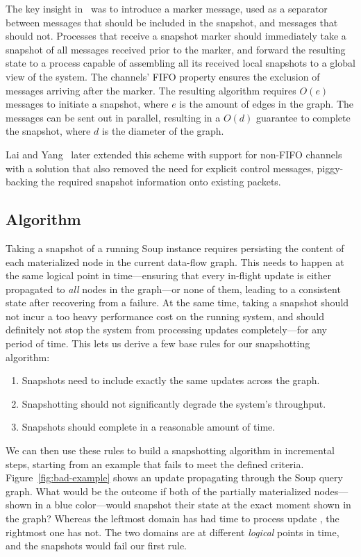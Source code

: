 The key insight in~\cite{chandy-lamport} was to introduce a marker message, used
as a separator between messages that should be included in the snapshot, and
messages that should not. Processes that receive a snapshot marker should
immediately take a snapshot of all messages received prior to the marker, and
forward the resulting state to a process capable of assembling all its received
local snapshots to a global view of the system. The channels' FIFO property
ensures the exclusion of messages arriving after the marker. The resulting
algorithm requires $ O(e) $ messages to initiate a snapshot, where $ e $
is the amount of edges in the graph. The messages can be sent out in parallel,
resulting in a $ O(d) $ guarantee to complete the snapshot, where $ d $ is the
diameter of the graph.

Lai and Yang~\cite{lai-yang} later extended this scheme with support for
non-FIFO channels with a solution that also removed the need for explicit
control messages, piggy-backing the required snapshot information onto existing
packets.

\subsection{Algorithm}

Taking a snapshot of a running Soup instance requires persisting the content of
each materialized node in the current data-flow graph. This needs to happen at
the same logical point in time---ensuring that every in-flight update is either
propagated to \textit{all} nodes in the graph---or none of them, leading
to a consistent state after recovering from a failure. At the same time, taking
a snapshot should not incur a too heavy performance cost on the running system,
and should definitely not stop the system from processing updates
completely---for any period of time. This lets us derive a few base rules for
our snapshotting algorithm:

\begin{enumerate}
  \item Snapshots need to include exactly the same updates across the graph.
  \item Snapshotting should not significantly degrade the system's throughput.
  \item Snapshots should complete in a reasonable amount of time.
\end{enumerate}

We can then use these rules to build a snapshotting algorithm in incremental
steps, starting from an example that fails to meet the defined criteria.
Figure~\ref{fig:bad-example} shows an update propagating through the Soup query
graph. What would be the outcome if both of the partially materialized
nodes---shown in a blue color---would snapshot their state at the exact moment
shown in the graph? Whereas the leftmost domain has had time to process update
, the rightmost one has not. The two domains are at different
\textit{logical} points in time, and the snapshots would fail our first rule.

